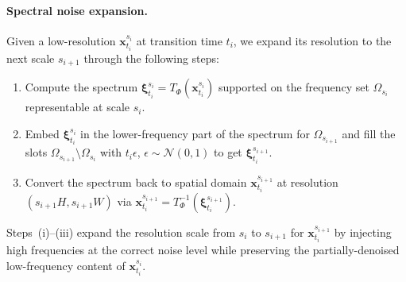 \paragraph{Spectral noise expansion.}
Given a low-resolution $\mathbf{x}^{s_i}_{t_i}$ at transition time $t_i$, we expand its resolution to the next scale $s_{i + 1}$ through the following steps:
\begin{enumerate}
  \item[(i)] Compute the spectrum $\boldsymbol{\xi}^{s_i}_{t_i} = T_\Phi(\mathbf{x}^{s_i}_{t_i})$ supported on the frequency set $\Omega_{s_i}$ representable at scale $s_i$.
  \item[(ii)] Embed $\boldsymbol{\xi}^{s_i}_{t_i}$ in the lower-frequency part of the spectrum for $\Omega_{s_{i + 1}}$ and fill the slots $\Omega_{s_{i+1}} \setminus \Omega_{s_i}$ with $t_i \epsilon$, $\epsilon \sim \mathcal{N}(0, 1)$ to get $\boldsymbol{\xi}^{s_{i + 1}}_{t_i}$. 
  \item[(iii)] Convert the spectrum back to spatial domain $\mathbf{x}^{s_{i+1}}_{t_i}$ at resolution $(s_{i+1}H, s_{i+1}W)$ via $\mathbf{x}^{s_{i+1}}_{t_i} = T_\Phi^{-1}(\boldsymbol{\xi}^{s_{i + 1}}_{t_i})$.
\end{enumerate}
Steps~(i)--(iii) expand the resolution scale from $s_i$ to $s_{i + 1}$ for $\mathbf{x}_{t_i}^{s_{i + 1}}$ by injecting high frequencies at the correct noise level while preserving the partially-denoised low-frequency content of $\mathbf{x}^{s_i}_{t_i}$.


